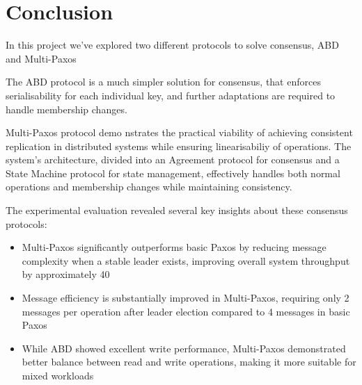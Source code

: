 \documentclass[10pt,a4paper,twocolumn]{article}
\begin{document}
\section{Conclusion}
\label{conclusion}
In this project we've explored two different protocols to solve consensus, ABD and Multi-Paxos
\par The ABD protocol is a much simpler solution for consensus, that enforces serialisability for each individual key, and further adaptations are required to handle membership changes.
\par Multi-Paxos protocol demo nstrates the practical viability of achieving consistent replication in distributed systems while ensuring linearisabiliy of operations. The system's architecture, divided into an Agreement protocol for consensus and a State Machine protocol for state management, effectively handles both normal operations and membership changes while maintaining consistency.
\par The experimental evaluation revealed several key insights about these consensus protocols:
\begin{itemize}
\setlength\itemsep{0em}
\item Multi-Paxos significantly outperforms basic Paxos by reducing message complexity when a stable leader exists, improving overall system throughput by approximately 40%
\item Message efficiency is substantially improved in Multi-Paxos, requiring only 2 messages per operation after leader election compared to 4 messages in basic Paxos
\item While ABD showed excellent write performance, Multi-Paxos demonstrated better balance between read and write operations, making it more suitable for mixed workloads
\end{itemize}

\appendix
\onecolumn
\end{document}

